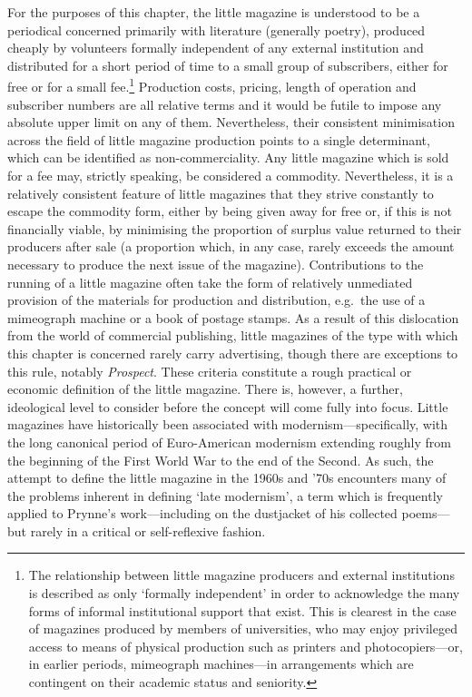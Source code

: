 \documentclass[]{article}
\begin{document}
For the purposes of this chapter, the little magazine is understood to
be a periodical concerned primarily with literature (generally poetry),
produced cheaply by volunteers formally independent of any external
institution and distributed for a short period of time to a small group
of subscribers, either for free or for a small fee.\footnote{The
  relationship between little magazine producers and external
  institutions is described as only `formally independent' in order to
  acknowledge the many forms of informal institutional support that
  exist. This is clearest in the case of magazines produced by members
  of universities, who may enjoy privileged access to means of physical
  production such as printers and photocopiers---or, in earlier periods,
  mimeograph machines---in arrangements which are contingent on their
  academic status and seniority.} Production costs, pricing, length of
operation and subscriber numbers are all relative terms and it would be
futile to impose any absolute upper limit on any of them. Nevertheless,
their consistent minimisation across the field of little magazine
production points to a single determinant, which can be identified as
non-commerciality. Any little magazine which is sold for a fee may,
strictly speaking, be considered a commodity. Nevertheless, it is a
relatively consistent feature of little magazines that they strive
constantly to escape the commodity form, either by being given away for
free or, if this is not financially viable, by minimising the proportion
of surplus value returned to their producers after sale (a proportion
which, in any case, rarely exceeds the amount necessary to produce the
next issue of the magazine). Contributions to the running of a little
magazine often take the form of relatively unmediated provision of the
materials for production and distribution, e.g.~the use of a mimeograph
machine or a book of postage stamps. As a result of this dislocation
from the world of commercial publishing, little magazines of the type
with which this chapter is concerned rarely carry advertising, though
there are exceptions to this rule, notably \emph{Prospect}. These
criteria constitute a rough practical or economic definition of the
little magazine. There is, however, a further, ideological level to
consider before the concept will come fully into focus. Little magazines
have historically been associated with modernism---specifically, with
the long canonical period of Euro-American modernism extending roughly
from the beginning of the First World War to the end of the Second. As
such, the attempt to define the little magazine in the 1960s and '70s
encounters many of the problems inherent in defining `late modernism', a
term which is frequently applied to Prynne's work---including on the
dustjacket of his collected poems---but rarely in a critical or
self-reflexive fashion.
\end{document}
